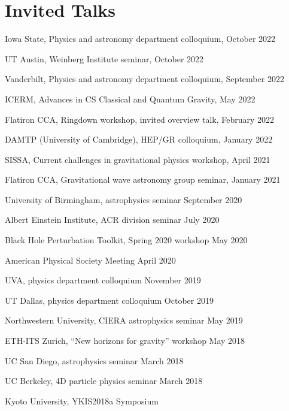 \newcommand{\playsymbol}{$\blacktriangleright$}
\section{\sc Invited Talks}
\begin{etaremune}
\item
  Iowa State, Physics and astronomy department colloquium,
  \hfill{}
  October 2022
\item
  UT Austin, Weinberg Institute seminar,
  \hfill{}
  October 2022
\item
  Vanderbilt, Physics and astronomy department colloquium,
  \hfill{}
  September 2022
\item
  ICERM, Advances in CS Classical and Quantum Gravity,
  \hfill{}
  May 2022
\item
  Flatiron CCA, Ringdown workshop, invited overview talk,
  \hfill{}
  February 2022
\item
  DAMTP (University of Cambridge), HEP/GR colloquium,
  \hfill{}
  January 2022
\item
  SISSA, Current challenges in gravitational physics workshop,
  \hfill{}
  April 2021
\item
  Flatiron CCA, Gravitational wave astronomy group seminar,
  \hfill{}
  January 2021
\item
  University of Birmingham, astrophysics seminar
  \hfill{}
  September 2020
\item
  Albert Einstein Institute, ACR division seminar
  \hfill{}
  July 2020
\item
  Black Hole Perturbation Toolkit, Spring 2020 workshop
  \hfill{}
  May 2020
\item
  American Physical Society Meeting
  \hfill{}
  April 2020
\item
  UVA, physics department colloquium
  \hfill{}
  November 2019
\item
  UT Dallas, physics department colloquium
  \hfill{}
  October 2019
\item
  Northwestern University, CIERA astrophysics seminar
  \hfill{}
  May 2019
\item
  ETH-ITS Zurich, ``New horizons for gravity'' workshop
  \hfill{}
  May 2018
\item
  UC San Diego, astrophysics seminar
  \hfill{}
  March 2018
\item
  UC Berkeley, 4D particle physics seminar
  \hfill{}
  March 2018
\item
  Kyoto University, YKIS2018a Symposium

\end{etaremune}
